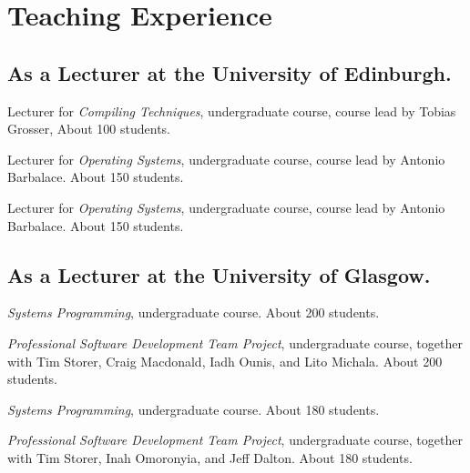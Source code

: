 \section{Teaching Experience}

\subsection{\footnotesize As a Lecturer at the University of Edinburgh.}

\begin{cvitemize}[\small 2021 - 2022]
    \item Lecturer for \emph{Compiling Techniques}, undergraduate course, course lead by Tobias Grosser, About 100 students.
    \item Lecturer for \emph{Operating Systems}, undergraduate course, course lead by Antonio Barbalace. About 150 students.
\end{cvitemize}

\begin{cvitemize}[\small 2020 - 2021]
    \item Lecturer for \emph{Operating Systems}, undergraduate course, course lead by Antonio Barbalace. About 150 students.
\end{cvitemize}

\subsection{\footnotesize As a Lecturer at the University of Glasgow.}

\begin{cvitemize}[\small 2019 - 2020]
    \item \emph{Systems Programming}, undergraduate course. About 200 students.
    \item \emph{Professional Software Development Team Project}, undergraduate course, together with  Tim Storer, Craig Macdonald, Iadh Ounis, and Lito Michala. About 200 students.
\end{cvitemize}

\begin{cvitemize}[\small 2018 - 2019]
    \item \emph{Systems Programming}, undergraduate course. About 180 students.
    \item \emph{Professional Software Development Team Project}, undergraduate course, together with  Tim Storer, Inah Omoronyia, and Jeff Dalton. About 180 students.
\end{cvitemize}


